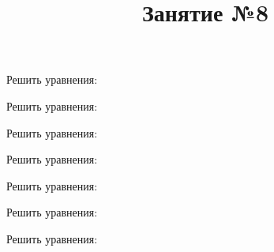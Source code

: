 \title{Занятие №8}
\begin{listofex}
	\item Решить уравнения:
	\begin{enumcols}[itemcolumns=2]
		\item {}
		\item {}
		\item {}
		\item {}
	\end{enumcols}
	\item Решить уравнения:
	\begin{enumcols}[itemcolumns=2]
		\item {}
		\item {}
	\end{enumcols}
	\item Решить уравнения:
	\begin{enumcols}[itemcolumns=4]
		\item {}
		\item {}
		\item {}
		\item {}
	\end{enumcols}
	\item Решить уравнения:
	\begin{enumcols}[itemcolumns=2]
		\item {}
		\item {}
		\item {}
		\item {}
	\end{enumcols}
	\item Решить уравнения:
	\begin{enumcols}[itemcolumns=2]
		\item {}
		\item {}
		\item {}
	\end{enumcols}
	\item Решить уравнения:
	\begin{enumcols}[itemcolumns=3]
		\item {}
		\item {}
		\item {}
	\end{enumcols}
	\item Решить уравнения:
	\begin{enumcols}[itemcolumns=1]
		\item {}
		\item {}
		\item {}
	\end{enumcols}
	\item {}
	\item {}
\end{listofex}